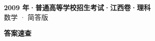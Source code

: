 \documentclass[zihao=-4, a4paper]{ctexart}
\begin{document}
\begin{center}
  {\Large\bfseries 2009 年·普通高等学校招生考试·江西卷·理科}\\[4pt]
  {\large 数学 · 简答版}
\end{center}
\medskip
{}

\clearpage
{}
\begin{center}{\Large\bfseries 答案速查}\end{center}
\medskip

\end{document}
